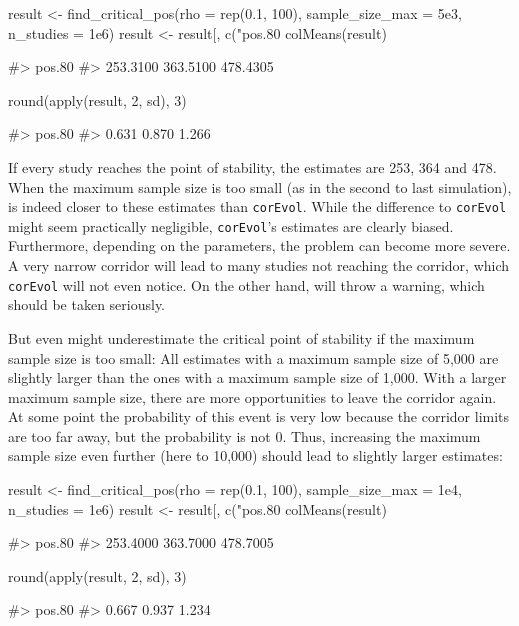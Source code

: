 \begin{Schunk}
\begin{Sinput}
result <- find_critical_pos(rho = rep(0.1, 100), sample_size_max = 5e3,
                            n_studies = 1e6)
result <- result[, c("pos.80%", "pos.90%", "pos.95%")]
colMeans(result)
\end{Sinput}
\begin{Soutput}
#>  pos.80%  pos.90%  pos.95% 
#> 253.3100 363.5100 478.4305
\end{Soutput}
\begin{Sinput}
round(apply(result, 2, sd), 3)
\end{Sinput}
\begin{Soutput}
#> pos.80% pos.90% pos.95% 
#>   0.631   0.870   1.266
\end{Soutput}
\end{Schunk}

If every study reaches the point of stability, the estimates are 253, 364 and 478. When the maximum sample size is too small (as in the second to last simulation),  is indeed closer to these estimates than \texttt{corEvol}. While the difference to \texttt{corEvol} might seem practically negligible, \texttt{corEvol}'s estimates are clearly biased. Furthermore, depending on the parameters, the problem can become more severe. A very narrow corridor will lead to many studies not reaching the corridor, which \texttt{corEvol} will not even notice. On the other hand,  will throw a warning, which should be taken seriously.

But even  might underestimate the critical point of stability if the maximum sample size is too small: All estimates with a maximum sample size of 5,000 are slightly larger than the ones with a maximum sample size of 1,000. With a larger maximum sample size, there are more opportunities to leave the corridor again. At some point the probability of this event is very low because the corridor limits are too far away, but the probability is not 0. Thus, increasing the maximum sample size even further (here to 10,000) should lead to slightly larger estimates:

\begin{Schunk}
\begin{Sinput}
result <- find_critical_pos(rho = rep(0.1, 100), sample_size_max = 1e4,
                            n_studies = 1e6)
result <- result[, c("pos.80%", "pos.90%", "pos.95%")]
colMeans(result)
\end{Sinput}
\begin{Soutput}
#>  pos.80%  pos.90%  pos.95% 
#> 253.4000 363.7000 478.7005
\end{Soutput}
\begin{Sinput}
round(apply(result, 2, sd), 3)
\end{Sinput}
\begin{Soutput}
#> pos.80% pos.90% pos.95% 
#>   0.667   0.937   1.234
\end{Soutput}
\end{Schunk}

